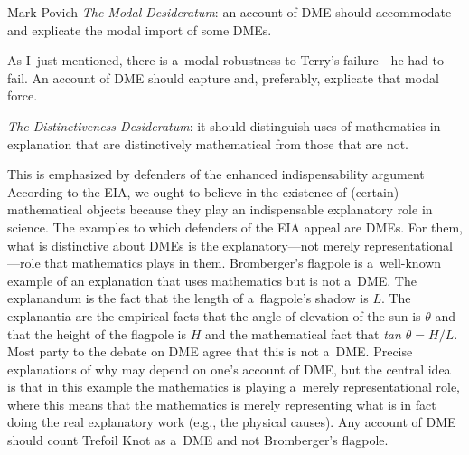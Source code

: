 \begin{artengenv}{Mark Povich}
\hangindent=0.6cm
\textit{The Modal Desideratum}: an account of DME should accommodate and explicate the modal import of some DMEs.
\parencite[][]{baron_explaining_2016}%


As I~just mentioned, there is a~modal robustness to Terry's failure---he had to fail. An account of DME should capture and, preferably, explicate that modal force.

\hangindent=0.6cm
\textit{The Distinctiveness Desideratum}: it should distinguish uses of mathematics in explanation that are distinctively mathematical from those that are not.
\parencite[][]{baron_explaining_2016}%


This is emphasized by defenders of the enhanced indispensability argument
\parencite[EIA, e.g.,][]{baker_mathematical_2009}
 According to the EIA, we ought to believe in the existence of (certain) mathematical objects because they play an indispensable explanatory role in science. The examples to which defenders of the EIA appeal are DMEs. For them, what is distinctive about DMEs is the explanatory---not merely representational---role that mathematics plays in them. Bromberger's 
\parencite*[][]{bromberger_why-questions_1966} %
 flagpole is a~well-known example of an explanation that uses mathematics but is not a~DME. The explanandum is the fact that the length of a~flagpole's shadow is $L$. The explanantia are the empirical facts that the angle of elevation of the sun is $\theta$ and that the height of the flagpole is $H$ and the mathematical fact that \textit{tan $\theta  = H/L$}. Most party to the debate on DME agree that this is not a~DME. Precise explanations of why may depend on one's account of DME, but the central idea is that in this example the mathematics is playing a~merely representational role, where this means that the mathematics is merely representing what is in fact doing the real explanatory work (e.g., the physical causes). Any account of DME should count Trefoil Knot as a~DME and not Bromberger's flagpole.



\end{artengenv}
